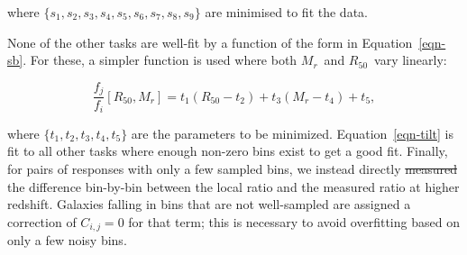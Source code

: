 \documentclass[useAMS,usenatbib]{mn2e}
\newcommand{\mr}{$M_r$}
\newcommand{\rfifty}{$R_{50}$}
\providecommand{\DIFaddtex}[1]{{\protect\color{blue}\uwave{#1}}} %
\providecommand{\DIFdeltex}[1]{{\protect\color{red}\sout{#1}}}                      %
\providecommand{\DIFaddbegin}{} %
\providecommand{\DIFaddend}{} %
\providecommand{\DIFdelbegin}{} %
\providecommand{\DIFdelend}{} %
\providecommand{\DIFadd}[1]{\texorpdfstring{\DIFaddtex{#1}}{#1}} %
\providecommand{\DIFdel}[1]{\texorpdfstring{\DIFdeltex{#1}}{}} %
\begin{document}
\DIFdelend where $\{s_1,s_2,s_3,s_4,s_5,s_6,s_7,s_8,s_9\}$ are minimised to fit the data. %

None of the other tasks are well-fit by a function of the form in Equation~\ref{eqn-sb}. For these, a simpler function is used where both \mr~and \rfifty~vary linearly:
\DIFdelbegin %

\DIFdelend \begin{equation}
\frac{f_j}{f_i}[R_{50},M_r] = t_1(R_{50} - t_2) + t_3(M_r - t_4) + t_5,
\label{eqn-tilt}
\end{equation}
\DIFdelbegin %

\DIFdelend where $\{t_1,t_2,t_3,t_4,t_5\}$ are the parameters to be minimized. Equation~\ref{eqn-tilt} is fit to all other tasks where enough non-zero bins exist to get a good fit. Finally, for pairs of responses with only a few sampled bins, we instead directly \DIFdelbegin \DIFdel{measured }\DIFdelend \DIFaddbegin \DIFadd{measurd }\DIFaddend the difference bin-by-bin between the local ratio and the measured ratio at higher redshift. Galaxies falling in bins that are not well-sampled are assigned a correction of $C_{i,j}=0$ for that term; this is necessary to avoid overfitting based on only a few noisy bins. 


\end{document}
